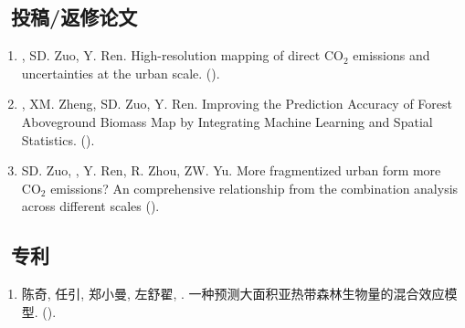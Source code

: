\subsection*{\texorpdfstring{\faBook\ 投稿/返修论文}{投稿/返修论文}}
\begin{enumerate}
\item
    \Shaoqing, SD. Zuo,  Y. Ren.
    High-resolution mapping of direct CO$_2$ emissions and uncertainties at the urban scale. 
    (\Submitted).
\item
    \Shaoqing\CF, XM. Zheng, SD. Zuo,  Y. Ren.
    Improving the Prediction Accuracy of Forest Aboveground Biomass Map by Integrating Machine Learning and Spatial Statistics. 
    (\Submitted).
\item
    SD. Zuo, \Shaoqing, Y. Ren, R. Zhou,   ZW. Yu.
    More fragmentized urban form more CO$_2$ emissions? An comprehensive relationship from the combination analysis across different scales 
    (\Revision).
\end{enumerate}
\subsection*{\texorpdfstring{\faBook\ 专利}{专利}}
\begin{enumerate}
\item
     陈奇, 任引, 郑小曼, 左舒翟, {}.
     一种预测大面积亚热带森林生物量的混合效应模型.
     ({}).
\end{enumerate}